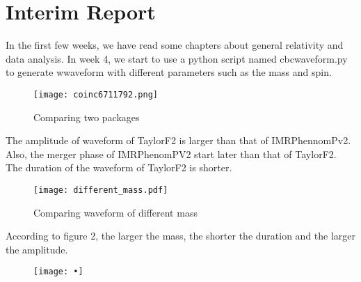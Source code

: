 \documentclass[10pt,a4paper]{article}
\begin{document}
\section{Interim Report}
In the first few weeks, we have read some chapters about general relativity and data analysis. In week 4, we start to use a python script named cbcwaveform.py to generate wwaveform with different parameters such as the mass and spin.
\newpage
\begin{figure}[h]
\texttt{[image: coinc6711792.png]}
\caption{Comparing two packages}
\end{figure}
The amplitude of waveform of TaylorF2 is larger than that of IMRPhennomPv2. Also, the merger phase of IMRPhenomPV2 start later than that of TaylorF2. The duration of the waveform of TaylorF2 is shorter. 
\begin{figure}[h]
\texttt{[image: different\_mass.pdf]}
\caption{Comparing waveform of different mass}
\end{figure}
\newpage
According to figure 2, the larger the mass, the shorter the duration and the larger the amplitude.
\begin{figure}
\texttt{[image: •]}
\end{figure}
\end{document}
